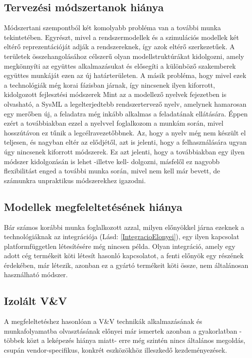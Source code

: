     \subsection{Tervezési módszertanok hiánya} \label{ModszertanHianya}
    Módszertani szempontból két komolyabb probléma van a további munka tekintetében.
    Egyrészt, mivel a rendszermodellek és a szimulációs modellek két eltérő reprezentációját adják a rendszereknek, így azok eltérő szerkezetűek.
    A területek összehangolásához célszerű olyan modellstruktúrákat kidolgozni, amely megkönnyíti az együttes alkalmazásukat és elősegíti a különböző szakemberek együttes munkáját ezen az új határterületen.
    A másik probléma, hogy mivel ezek a technológiák még korai fázisban járnak, így nincsenek ilyen kiforrott, kidolgozott fejlesztési módszerek
    Mint az a modellező nyelvek fejezetben is olvasható, a SysML a legelterjedtebb rendszertervező nyelv, amelynek hamarosan egy merőben új, a feladatra még inkább alkalmas a feladatának ellátására.
    Éppen ezért a továbbiakban ezzel a nyelvvel foglalkozom a munkám során, mivel hosszútávon ez tűnik a legcélravezetőbbnek.
    Az, hogy a nyelv még nem készült el teljesen, és nagyban eltér az elődjétől, azt is jelenti, hogy a felhasználására ugyan úgy nincsenek kiforrott módszerek.
    Ez azt jelenti, hogy a továbbiakban egy ilyen módszer kidolgozásán is lehet -illetve kell- dolgozni, másfelől ez nagyobb flexibilitást enged a további munka során, mivel nem kell már bevett, de számunkra unpraktikus módszerekhez igazodni.

    \subsection{Modellek megfeleltetésének hiánya}
    Bár számos korábbi munka foglalkozott azzal, milyen előnyökkel járna ezeknek a technológiáknak az integrációja (Lásd: \ref{IntegracioElonyei}), egy ilyen kapcsolat platformfüggetlen létesítésére még nincsen példa.
    Olyan integráció, amely egy adott cég termékeit köti létesít hasonló kapcsolatot, a fenti előnyök egy részének érdekében, már létezik, azonban ez a gyártó termékeit köti össze, nem általánosan használható módszer.

    \subsection{Izolált V\&V}
    A megfeleltetéshez hasonlóan a V\&V technikák alkalmazásának és munkafolyamatba olvasztásának előnyei már ismertek azonban a gyakorlatban -többek közt a leképezés hiánya miatt- erre még szintén nincs általános megoldás, csupán vendor-specifikus, konkrét eszközökhöz illeszkedő kezdeményezések.


